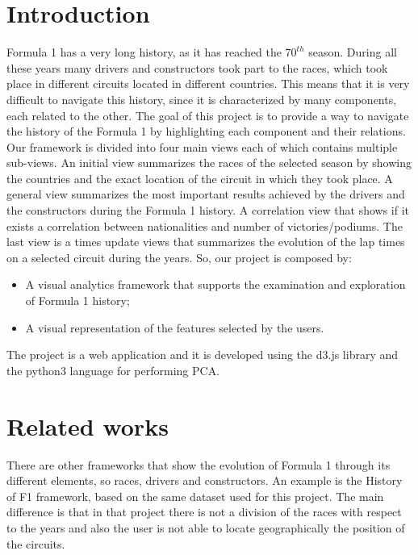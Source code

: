 \documentclass[10pt,twocolumn,letterpaper]{article}
\begin{document}
\section{Introduction}
Formula 1 has a very long history, as it has reached the $70^{th}$ season. During all these years many drivers and constructors took part to the races, which took
place in different circuits located in different countries. This means that it is very difficult to navigate this history, since it is characterized by many components,
each related to the other. The goal of this project is to provide a way to navigate the history of the Formula 1 by highlighting each component and their relations.
Our framework is divided into four main views each of which contains multiple sub-views. An initial view summarizes the races of the selected season by showing
the countries and the exact location of the circuit in which they took place. A general view summarizes the most important results achieved by the drivers and the
constructors during the Formula 1 history. A correlation view that shows if it exists a correlation between nationalities and number of victories/podiums. The last
view is a times update views that summarizes the evolution of the lap times on a selected circuit during the years. So, our project is composed by:
\begin{itemize}
	\item A visual analytics framework that supports the examination and exploration of Formula 1 history;
	\item A visual representation of the features selected by the users.
\end{itemize}
The project is a web application and it is developed using the d3.js \cite{D3} library and the python3 language for performing PCA.

\section{Related works}
There are other frameworks that show the evolution of Formula 1 through its different elements, so races, drivers and constructors. An example is the History of F1
\cite{HistoryOfF1} framework, based on the same dataset used for this project. The main difference is that in that project
there is not a division of the races with respect to the years and also the user is not able to locate geographically the position of the circuits. 
\end{document}
